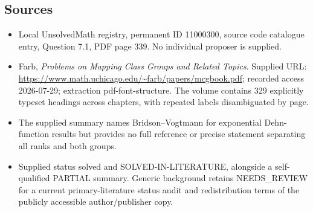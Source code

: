 \documentclass[11pt]{article}
\begin{document}
\subsection{Sources}
\begin{itemize}
\item Local UnsolvedMath registry, permanent ID 11000300, source code catalogue entry, Question 7.1, PDF page 339. No individual proposer is supplied.
\item Farb, \emph{Problems on Mapping Class Groups and Related Topics}. Supplied URL: \url{https://www.math.uchicago.edu/~farb/papers/mcgbook.pdf}; recorded access 2026-07-29; extraction pdf-font-structure. The volume contains 329 explicitly typeset headings across chapters, with repeated labels disambiguated by page.
\item The supplied summary names Bridson--Vogtmann for exponential Dehn-function results but provides no full reference or precise statement separating all ranks and both groups.
\item Supplied status solved and SOLVED-IN-LITERATURE, alongside a self-qualified PARTIAL summary. Generic background retains NEEDS\_REVIEW for a current primary-literature status audit and redistribution terms of the publicly accessible author/publisher copy.
\end{itemize}
\end{document}
